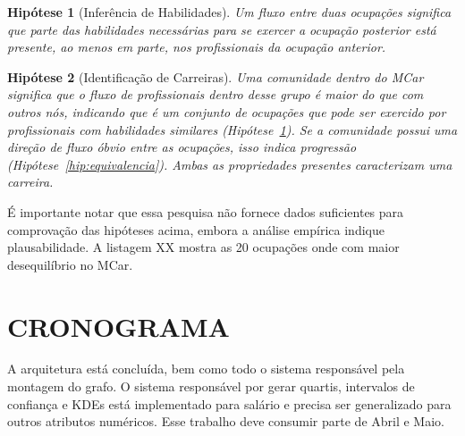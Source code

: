 \documentclass[12pt,a4paper]{article}
\theoremstyle{hypo}
\newtheorem{hypothesis}{Hipótese}
\begin{document}
\begin{hypothesis}[Inferência de Habilidades] \label{hip:habilidades}
Um fluxo entre duas ocupações significa que parte das habilidades necessárias para se exercer a ocupação posterior está presente, ao menos em parte, nos profissionais da ocupação anterior.
\end{hypothesis}

\begin{hypothesis}[Identificação de Carreiras]
Uma comunidade dentro do MCar significa que o fluxo de profissionais dentro desse grupo é maior do que com outros nós, indicando que é um conjunto de ocupações que pode ser exercido por profissionais com habilidades similares (Hipótese~\ref{hip:habilidades}). Se a comunidade possui uma direção de fluxo óbvio entre as ocupações, isso indica progressão (Hipótese~\ref{hip:equivalencia}). Ambas as propriedades presentes caracterizam uma carreira.
\end{hypothesis}

É importante notar que essa pesquisa não fornece dados suficientes para comprovação das hipóteses acima, embora a análise empírica indique plausabilidade. A listagem XX mostra as 20 ocupações onde com maior desequilíbrio no MCar.
\section{CRONOGRAMA}

A arquitetura está concluída, bem como todo o sistema responsável pela montagem do grafo. O sistema responsável por gerar quartis, intervalos de confiança e KDEs está implementado para salário e precisa ser generalizado para outros atributos numéricos. Esse trabalho deve consumir parte de Abril e Maio.
\end{document}
